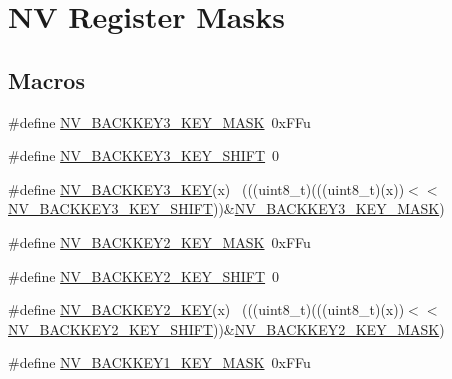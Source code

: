 \hypertarget{group___n_v___register___masks}{}\section{NV Register Masks}
\label{group___n_v___register___masks}
\subsection*{Macros}
\begin{DoxyCompactItemize}
\item 
\#define \hyperlink{group___n_v___register___masks_gabe9123bc8137627b30e4f75c757cfb95}{N\+V\+\_\+\+B\+A\+C\+K\+K\+E\+Y3\+\_\+\+K\+E\+Y\+\_\+\+M\+A\+SK}~0x\+F\+Fu
\item 
\#define \hyperlink{group___n_v___register___masks_ga78b75e37d984596ddd9053d2125a78ff}{N\+V\+\_\+\+B\+A\+C\+K\+K\+E\+Y3\+\_\+\+K\+E\+Y\+\_\+\+S\+H\+I\+FT}~0
\item 
\#define \hyperlink{group___n_v___register___masks_ga60012399e688ca410ed3d4c7f58d5f91}{N\+V\+\_\+\+B\+A\+C\+K\+K\+E\+Y3\+\_\+\+K\+EY}(x)                                          ~(((uint8\+\_\+t)(((uint8\+\_\+t)(x))$<$$<$\hyperlink{group___n_v___register___masks_ga78b75e37d984596ddd9053d2125a78ff}{N\+V\+\_\+\+B\+A\+C\+K\+K\+E\+Y3\+\_\+\+K\+E\+Y\+\_\+\+S\+H\+I\+FT}))\&\hyperlink{group___n_v___register___masks_gabe9123bc8137627b30e4f75c757cfb95}{N\+V\+\_\+\+B\+A\+C\+K\+K\+E\+Y3\+\_\+\+K\+E\+Y\+\_\+\+M\+A\+SK})
\item 
\#define \hyperlink{group___n_v___register___masks_ga5bf8822b0b59a321d9b5c30eb1618704}{N\+V\+\_\+\+B\+A\+C\+K\+K\+E\+Y2\+\_\+\+K\+E\+Y\+\_\+\+M\+A\+SK}~0x\+F\+Fu
\item 
\#define \hyperlink{group___n_v___register___masks_ga408b1083508e784cba76d5be9b147a84}{N\+V\+\_\+\+B\+A\+C\+K\+K\+E\+Y2\+\_\+\+K\+E\+Y\+\_\+\+S\+H\+I\+FT}~0
\item 
\#define \hyperlink{group___n_v___register___masks_ga5641a6e4f33b369fdcbefa85524b0610}{N\+V\+\_\+\+B\+A\+C\+K\+K\+E\+Y2\+\_\+\+K\+EY}(x)                                          ~(((uint8\+\_\+t)(((uint8\+\_\+t)(x))$<$$<$\hyperlink{group___n_v___register___masks_ga408b1083508e784cba76d5be9b147a84}{N\+V\+\_\+\+B\+A\+C\+K\+K\+E\+Y2\+\_\+\+K\+E\+Y\+\_\+\+S\+H\+I\+FT}))\&\hyperlink{group___n_v___register___masks_ga5bf8822b0b59a321d9b5c30eb1618704}{N\+V\+\_\+\+B\+A\+C\+K\+K\+E\+Y2\+\_\+\+K\+E\+Y\+\_\+\+M\+A\+SK})
\item 
\#define \hyperlink{group___n_v___register___masks_ga6cd05d78b113df7f3cb0d11d29931666}{N\+V\+\_\+\+B\+A\+C\+K\+K\+E\+Y1\+\_\+\+K\+E\+Y\+\_\+\+M\+A\+SK}~0x\+F\+Fu

\end{DoxyCompactItemize}
